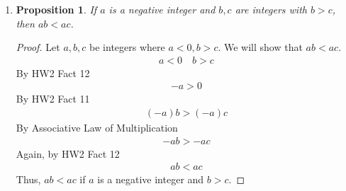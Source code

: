 \documentclass{article}
\newtheorem{prop}[thm]{Proposition}
\begin{document}
\begin{enumerate}
\item
\begin{prop}
If $a$ is a negative integer and $b, c$ are integers with $b > c$, then $ab < ac$.
\end{prop}
\begin{proof}
Let $a, b, c$ be integers where $a < 0, b > c$. We will show that $ab < ac$.
\begin{gather}
a < 0\quad b > c
\end{gather}
By HW2 Fact 12
\begin{gather}
-a > 0
\end{gather}
By HW2 Fact 11
\begin{gather}
(-a)b > (-a)c
\end{gather}
By Associative Law of Multiplication
\begin{gather}
-ab > -ac
\end{gather}
Again, by HW2 Fact 12
\begin{gather}
ab < ac
\end{gather}
Thus, $ab < ac$ if $a$ is a negative integer and $b > c$.
\end{proof}
    
\end{enumerate}
\end{document}
